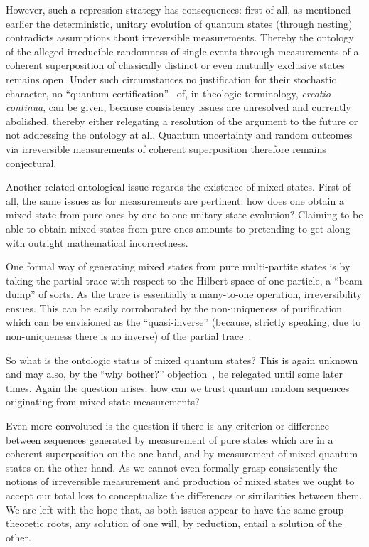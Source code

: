 \documentclass{ws-procs9x6}
\begin{document}
However, such a repression strategy has consequences:
first of all, as mentioned earlier the deterministic, unitary evolution of quantum states (through nesting) contradicts assumptions about irreversible measurements.
Thereby the ontology of the alleged irreducible randomness of single events through measurements of a coherent superposition of classically
distinct or even mutually exclusive states remains open.
Under such circumstances no justification for their stochastic character, no ``quantum certification''~\cite{zeil-05_nature_ofQuantum}
of, in theologic terminology, \emph{creatio continua},
can be given, because consistency issues are unresolved and currently abolished, thereby either relegating a resolution of the argument to the future
or not addressing the ontology at all.
Quantum uncertainty and random outcomes via irreversible measurements of coherent superposition therefore remains conjectural.

Another related ontological issue regards the existence of mixed states.
First of all, the same issues as for measurements are pertinent: how does one obtain a mixed state from pure ones by
one-to-one unitary state evolution?
Claiming to be able to obtain mixed states from pure ones amounts to pretending to get along with outright mathematical incorrectness.

One formal way of generating mixed states from pure multi-partite states
is by taking the partial trace with respect to the Hilbert space of one particle,
a ``beam dump'' of sorts\cite{engrt-sg-I,engrt-sg-II}.
As the trace is essentially a many-to-one operation, irreversibility ensues.
This can be easily corroborated by the non-uniqueness of purification which can be envisioned as the ``quasi-inverse''
(because, strictly speaking, due to non-uniqueness there is no inverse) of the partial trace~\cite[Section~8.3.1]{nielsen-book10}.

So what is the ontologic status of mixed quantum states? This is again unknown and may also, %
by the  ``why bother?'' objection~\cite{bell-a},
be relegated until some later times.
Again the question arises: how can we trust quantum random sequences originating from mixed state measurements?

Even more convoluted is the question if there is any criterion or difference between sequences generated
by measurement of pure states which are in a coherent superposition on the one hand,
and by measurement of mixed quantum states on the other hand.
As we cannot even formally grasp consistently the notions of irreversible measurement and production of mixed states
we ought to accept our total loss to conceptualize the differences or similarities between them.
We are left with the hope that, as both issues appear to have the same group-theoretic roots,
any solution of one will, by reduction, entail a solution of the other.
\end{document}
